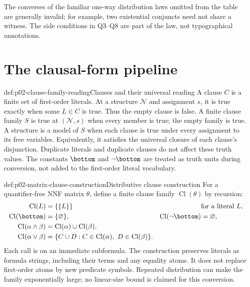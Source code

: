 The converses of the familiar one-way distribution laws omitted from the
table are generally invalid; for example, two existential conjuncts need not
share a witness.  The side conditions in Q3--Q8 are part of the law, not
typographical annotations.


\section{The clausal-form pipeline}
\label{sec:p02-fol-clausal-pipeline}

\begin{hbdefinition}{def:p02-clause-family-reading}{Clauses and their universal reading}
A clause \(C\) is a finite set of first-order literals.  At a structure
\(\mathcal N\) and assignment \(s\), it is true exactly when some
\(L\in C\) is true.  Thus the empty clause is false.  A finite clause
family \(S\) is true at \((\mathcal N,s)\) when every member is true;
the empty family is true.  A structure is a model of \(S\) when each
clause is true under every assignment to its free variables.  Equivalently,
it satisfies the universal closure of each clause's disjunction.
Duplicate literals and duplicate clauses do not affect these truth values.
The constants \(\bottom\) and \(\neg\bottom\) are treated as truth
units during conversion, not added to the first-order literal vocabulary.
\end{hbdefinition}

\begin{hbmethod}{def:p02-matrix-clause-construction}{Distributive clause construction}
For a quantifier-free NNF matrix \(\theta\), define a finite clause
family \(\operatorname{Cl}(\theta)\) by recursion:
\[
\begin{aligned}
 \operatorname{Cl}(L)&=\{\{L\}\} &&\text{for a literal }L,\\
 \operatorname{Cl}(\bottom)&=\{\varnothing\},&
 \operatorname{Cl}(\neg\bottom)&=\varnothing,\\
 \operatorname{Cl}(\alpha\land\beta)
   &=\operatorname{Cl}(\alpha)\cup\operatorname{Cl}(\beta),\\
 \operatorname{Cl}(\alpha\lor\beta)
   &=\{C\cup D:C\in\operatorname{Cl}(\alpha),\
                 D\in\operatorname{Cl}(\beta)\}.
\end{aligned}
\]
Each call is on an immediate subformula.  The construction preserves
literals as formula strings, including their terms and any equality
atoms.  It does not replace first-order atoms by new predicate symbols.
Repeated distribution can make the family exponentially large; no
linear-size bound is claimed for this conversion.
\end{hbmethod}

